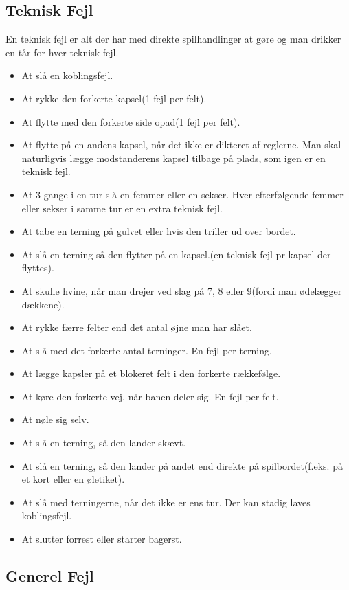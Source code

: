 \documentclass[12pt]{article}
\begin{document}
\subsection*{Teknisk Fejl}

En teknisk fejl er alt der har med direkte spilhandlinger at gøre og man drikker en tår for hver teknisk fejl.

\begin{itemize}
	\item At slå en koblingsfejl.
	\item At rykke den forkerte kapsel(1 fejl per felt).
	\item At flytte med den forkerte side opad(1 fejl per felt).
	\item At flytte på en andens kapsel, når det ikke er dikteret af reglerne. Man skal naturligvis lægge modstanderens kapsel tilbage på plads, som igen er en teknisk fejl.
	\item At 3 gange i en tur slå en femmer eller en sekser. Hver efterfølgende femmer eller sekser i samme tur er en extra teknisk fejl.
	\item At tabe en terning på gulvet eller hvis den triller ud over bordet.
	\item At slå en terning så den flytter på en kapsel.(en teknisk fejl pr kapsel der flyttes).
	\item At skulle hvine, når man drejer ved slag på 7, 8 eller 9(fordi man ødelægger dækkene).
	\item At rykke færre felter end det antal øjne man har slået.
	\item At slå med det forkerte antal terninger. En fejl per terning.
	\item At lægge kapsler på et blokeret felt i den forkerte rækkefølge.
	\item At køre den forkerte vej, når banen deler sig. En fejl per felt.
	\item At nøle sig selv.
	\item At slå en terning, så den lander skævt.
	\item At slå en terning, så den lander på andet end direkte på spilbordet(f.eks. på et kort eller en øletiket).
	\item At slå med terningerne, når det ikke er ens tur. Der kan stadig laves koblingsfejl.
        \item At slutter forrest eller starter bagerst.
\end{itemize}

\subsection*{Generel Fejl}
\end{document}
